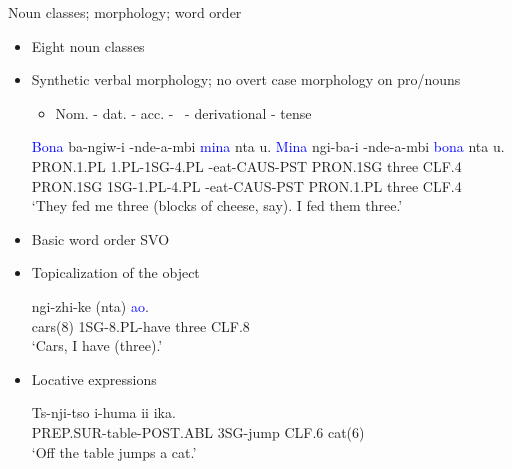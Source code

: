 \documentclass{beamer}
\newcommand{\exsc}[1]{{\tiny\MakeUppercase{#1}}}
\begin{document}
\begin{frame}{Noun classes; morphology; word order}
  \begin{itemize}
  \item Eight noun classes
  \pause
  \item Synthetic verbal morphology; no overt case morphology on pro/nouns
  \begin{itemize}
  \item Nom. - dat. - acc. - \textsurd\ - derivational - tense
  \end{itemize}
  {\scriptsize
    \begin{exe}
    \sn
    \gll \textcolor{blue}{Bona} ba-ngiw-i -nde-\textbeltl a-mbi \textcolor{blue}{mina} nta u. \textcolor{blue}{Mina} ngi-ba-i -nde-\textbeltl a-mbi \textcolor{blue}{bona} nta u. \\
    \exsc{pron.1.pl} \exsc{1.pl}-\exsc{1sg}-\exsc{4.pl} -eat-\exsc{caus}-\exsc{pst} \exsc{pron.1sg} three \exsc{clf.4} \exsc{pron.1sg} \exsc{1sg}-\exsc{1.pl}-\exsc{4.pl} -eat-\exsc{caus}-\exsc{pst} \exsc{pron.1.pl} three \exsc{clf.4} \\
    \trans `They fed me three (blocks of cheese, say). I fed them three.'
    \end{exe}
  }
\pause
\item Basic word order SVO
\item Topicalization of the object
{\scriptsize
\begin{exe}
\sn
{} ngi-zhi-ke (nta) \textcolor{blue}{a\textlyoghlig o}. \\
cars(8) \exsc{1sg}-\exsc{8.pl}-have three \exsc{clf.8} \\
\trans `Cars, I have (three).'
\end{exe}
}
\pause
\item Locative expressions
{\scriptsize
\begin{exe}
\sn
\gll Ts\textramshorns-nji-tso \textbeltl i-huma i\textlyoghlig i ika. \\
\exsc{prep.sur}-table-\exsc{post.abl} \exsc{3sg}-jump \exsc{clf}.6 cat(6) \\
\trans `Off the table jumps a cat.'
\end{exe}
}
\end{itemize}
\end{frame}
\end{document}
